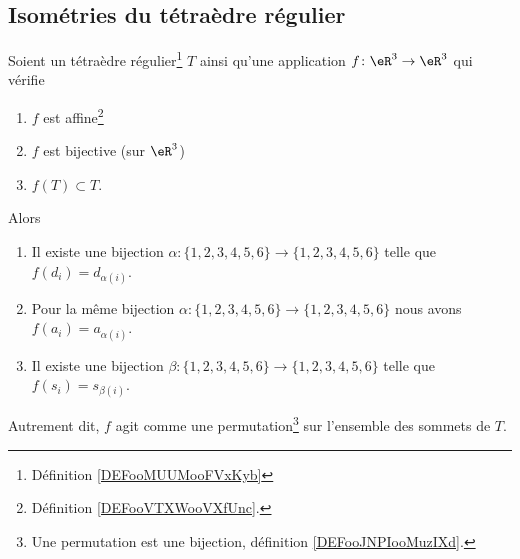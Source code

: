 \subsection{Isométries du tétraèdre régulier}

\begin{proposition}     \label{PROPooHTBIooTJQNZt}
	Soient un tétraèdre régulier\footnote{Définition \ref{DEFooMUUMooFVxKyb}} \( T\) ainsi qu'une application \( f\colon \eR^3\to \eR^3\) qui vérifie
	\begin{enumerate}
		\item
		      \( f\) est affine\footnote{Définition \ref{DEFooVTXWooVXfUnc}.}
		\item
		      \( f\) est bijective (sur \( \eR^3\))
		\item
		      \( f(T)\subset T\).
	\end{enumerate}
	Alors
	\begin{enumerate}
		\item       \label{ITEMooGAVPooVPESod}
		      Il existe une bijection \( \alpha\colon \{ 1,2,3,4,5,6 \}\to \{ 1,2,3,4,5,6 \}\) telle que \( f(d_i)=d_{\alpha(i)}\).
		\item       \label{ITEMooWRINooTlmXyI}
		      Pour la même bijection \( \alpha\colon \{ 1,2,3,4,5,6 \}\to \{ 1,2,3,4,5,6 \}\) nous avons \( f(a_i)=a_{\alpha(i)}\).
		\item       \label{ITEMooGPNPooZiEoLk}
		      Il existe une bijection \( \beta\colon \{ 1,2,3,4,5,6 \}\to \{ 1,2,3,4,5,6 \}\) telle que \( f(s_i)=s_{\beta(i)}\).
	\end{enumerate}
	Autrement dit, \( f\) agit comme une permutation\footnote{Une permutation est une bijection, définition \ref{DEFooJNPIooMuzIXd}.} sur l'ensemble des sommets de \( T\).
\end{proposition}

